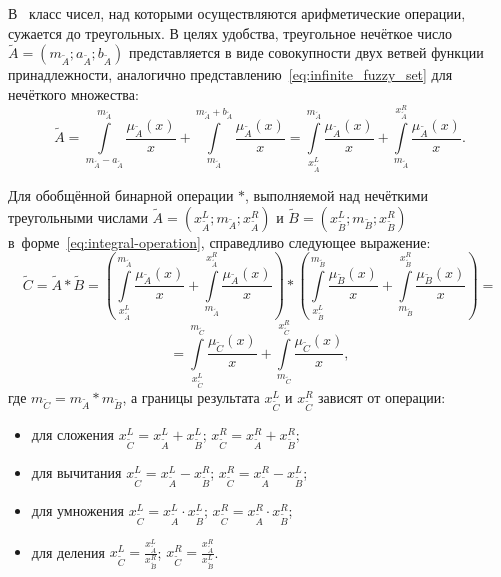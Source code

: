 В~\cite{Borisov_Krumberg_Riga} класс чисел, над которыми осуществляются арифметические операции, сужается до треугольных. В целях удобства, треугольное нечёткое число $\tilde{A}=\left( {{m}_{{\tilde{A}}}};{{a}_{{\tilde{A}}}};{{b}_{{\tilde{A}}}} \right)$ представляется в виде совокупности двух ветвей функции принадлежности, аналогично представлению~\eqref{eq:infinite_fuzzy_set} для нечёткого множества:
\begin{equation}
\label{eq:integral-operation}
	\tilde{A}=\int\limits_{{{m}_{{\tilde{A}}}}-{{a}_{{\tilde{A}}}}}^{{{m}_{{\tilde{A}}}}}{\frac{{{\mu }_{{\tilde{A}}}}\left( x \right)}{x}}+\int\limits_{{{m}_{{\tilde{A}}}}}^{{{m}_{{\tilde{A}}}}+{{b}_{{\tilde{A}}}}}{\frac{{{\mu }_{{\tilde{A}}}}\left( x \right)}{x}}=\int\limits_{x_{{\tilde{A}}}^{L}}^{{{m}_{{\tilde{A}}}}}{\frac{{{\mu }_{{\tilde{A}}}}\left( x \right)}{x}}+\int\limits_{{{m}_{{\tilde{A}}}}}^{x_{{\tilde{A}}}^{R}}{\frac{{{\mu }_{{\tilde{A}}}}\left( x \right)}{x}}.
\end{equation}

Для обобщённой бинарной операции $*$, выполняемой над нечёткими треугольными числами $\tilde{A}=\left( x_{{\tilde{A}}}^{L};{{m}_{{\tilde{A}}}};x_{{\tilde{A}}}^{R} \right)$ и $\tilde{B}=\left( x_{{\tilde{B}}}^{L};{{m}_{{\tilde{B}}}};x_{{\tilde{B}}}^{R} \right)$ в~форме~\eqref{eq:integral-operation}, справедливо следующее выражение:
\[
	\tilde{C}=\tilde{A}*\tilde{B}=\left( \int\limits_{x_{{\tilde{A}}}^{L}}^{{{m}_{{\tilde{A}}}}}{\frac{{{\mu }_{{\tilde{A}}}}\left( x \right)}{x}}+\int\limits_{{{m}_{{\tilde{A}}}}}^{x_{{\tilde{A}}}^{R}}{\frac{{{\mu }_{{\tilde{A}}}}\left( x \right)}{x}} \right)*\left( \int\limits_{x_{{\tilde{B}}}^{L}}^{{{m}_{{\tilde{B}}}}}{\frac{{{\mu }_{{\tilde{B}}}}\left( x \right)}{x}}+\int\limits_{{{m}_{{\tilde{B}}}}}^{x_{{\tilde{B}}}^{R}}{\frac{{{\mu }_{{\tilde{B}}}}\left( x \right)}{x}} \right)={}
\]
\[
	=\int\limits_{x_{{\tilde{C}}}^{L}}^{{{m}_{{\tilde{C}}}}}{\frac{{{\mu }_{{\tilde{C}}}}\left( x \right)}{x}}+\int\limits_{{{m}_{{\tilde{C}}}}}^{x_{{\tilde{C}}}^{R}}{\frac{{{\mu }_{{\tilde{C}}}}\left( x \right)}{x}} ,
\]
где $m_{\tilde C}=m_{\tilde A}*m_{\tilde B}$, а границы результата $x_{\tilde C}^{L}$ и $x_{\tilde C}^{R}$ зависят от операции:
\begin{itemize}
	\item для сложения $x_{{\tilde{C}}}^{L}=x_{{\tilde{A}}}^{L}+x_{{\tilde{B}}}^{L}$; $x_{{\tilde{C}}}^{R}=x_{{\tilde{A}}}^{R}+x_{{\tilde{B}}}^{R}$;
	\item для вычитания $x_{{\tilde{C}}}^{L}=x_{{\tilde{A}}}^{L}-x_{{\tilde{B}}}^{R}$; $x_{{\tilde{C}}}^{R}=x_{{\tilde{A}}}^{R}-x_{{\tilde{B}}}^{L}$;
	\item для умножения $x_{{\tilde{C}}}^{L}=x_{{\tilde{A}}}^{L}\cdot x_{{\tilde{B}}}^{L}$; $x_{{\tilde{C}}}^{R}=x_{{\tilde{A}}}^{R}\cdot x_{{\tilde{B}}}^{R}$;
	\item для деления $\displaystyle x_{{\tilde{C}}}^{L}=\frac{x_{{\tilde{A}}}^{L}}{x_{{\tilde{B}}}^{R}}$; $\displaystyle x_{{\tilde{C}}}^{R}=\frac{x_{{\tilde{A}}}^{R}}{x_{{\tilde{B}}}^{L}}$.
\end{itemize}

